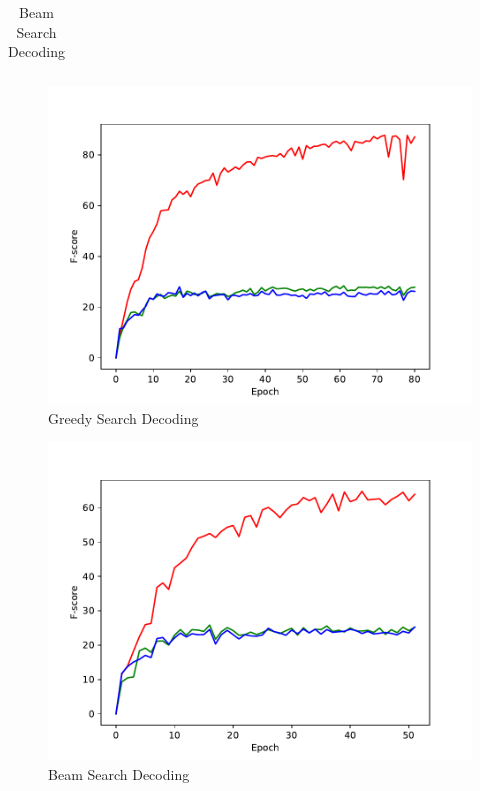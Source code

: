 \documentclass[11pt,a4paper]{article}
\begin{document}
\begin{table}[ht]
\centering
\begin{tabular}{cc}
\end{tabular}
\begin{subfigure}{0.3\textwidth}\centering\includegraphics[width=1.0\columnwidth]{fig_lrn_0p001_f.pdf}\caption{Greedy Search Decoding}\label{fig:tabc}\end{subfigure} 
\begin{subfigure}{0.3\textwidth}\centering\includegraphics[width=1.0\columnwidth]{fig_lrn_0p001_beam_3_f.pdf}\caption{Beam Search Decoding }\label{fig:tabd}\end{subfigure}

\end{table}
\end{document}
